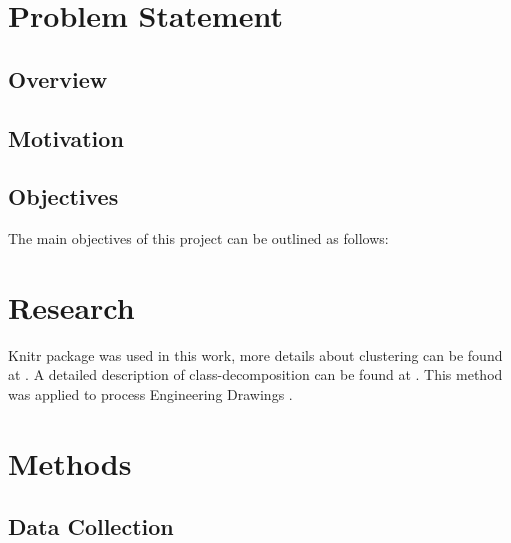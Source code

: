 \documentclass[10pt]{article}\usepackage[]{graphicx}\usepackage[]{color}
\begin{document}
\section{Problem Statement}\label{statement}


\subsection{Overview}\label{over}


\subsection{Motivation}\label{mot}

\subsection{Objectives }\label{obj}
The main objectives of this project can be outlined as follows: 
\section{Research}\label{research}

Knitr package was used in this work\cite{knitr2013}, more details about clustering can be found at \cite{ELYAN2017220}. A detailed description of class-decomposition can be found at \cite{Elyan2016}. This method was applied to process Engineering Drawings \cite{8489087}.




\section {Methods}\label{methods}




\subsection{Data Collection}\label{dataset}



\end{document}
